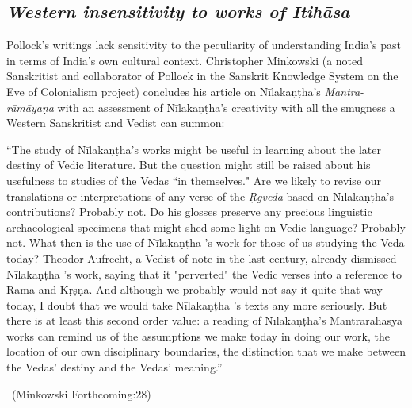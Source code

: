 \subsection*{\textit{Western insensitivity to works of Itihāsa}}

Pollock’s writings lack sensitivity to the peculiarity of understanding India’s past in terms of India’s own cultural context. Christopher Minkowski (a noted Sanskritist and collaborator of Pollock in the Sanskrit Knowledge System on the Eve of Colonialism project) concludes his article on Nīlakaṇṭha’s \textit{Mantra-rāmāyaṇa} with an assessment of Nīlakaṇṭha’s creativity with all the smugness a Western Sanskritist and Vedist can summon:

\begin{myquote}
“The study of Nīlakaṇṭha's works might be useful in learning about the later destiny of Vedic literature. But the question might still be raised about his usefulness to studies of the Vedas “in themselves." Are we likely to revise our translations or interpretations of any verse of the \textit{Ṛgveda} based on Nīlakaṇṭha's contributions? Probably not. Do his glosses preserve any precious linguistic archaeological specimens that might shed some light on Vedic language? Probably not. What then is the use of Nīlakaṇṭha 's work for those of us studying the Veda today? Theodor Aufrecht, a Vedist of note in the last century, already dismissed Nīlakaṇṭha 's work, saying that it "perverted" the Vedic verses into a reference to Rāma and Kṛṣṇa. And although we probably would not say it quite that way today, I doubt that we would take Nīlakaṇṭha 's texts any more seriously. But there is at least this second order value: a reading of Nīlakaṇṭha's Mantrarahasya works can remind us of the assumptions we make today in doing our work, the location of our own disciplinary boundaries, the distinction that we make between the Vedas' destiny and the Vedas' meaning.”

~\hfill (Minkowski Forthcoming:28)
\end{myquote}

